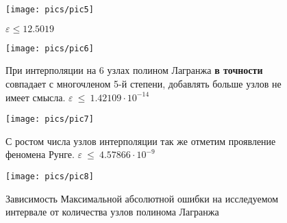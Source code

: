 \begin{figure}[H]
    \centering
    \caption{$\varepsilon \le 12.5019$}
    \texttt{[image: pics/pic5]}
    \label{pic:5}
\end{figure}

\begin{figure}[H]
    \centering
    \caption{При интерполяции на 6 узлах полином Лагранжа {\bf в точности} совпадает с многочленом 5-й степени, добавлять больше узлов не имеет смысла. $\varepsilon~\le~1.42109\cdot10^{-14}$}
    \texttt{[image: pics/pic6]}
    \label{pic:6}
\end{figure}

\begin{figure}[H]
    \centering
    \caption{С ростом числа узлов интерполяции так же отметим проявление феномена Рунге. $\varepsilon~\le~4.57866\cdot10^{-9}$}
    \texttt{[image: pics/pic7]}
    \label{pic:7}
\end{figure}

\begin{figure}[H]
    \centering
    \caption{Зависимость Максимальной абсолютной ошибки на исследуемом интервале от количества узлов полинома Лагранжа}
    \texttt{[image: pics/pic8]}
    \label{pic:8}
\end{figure}